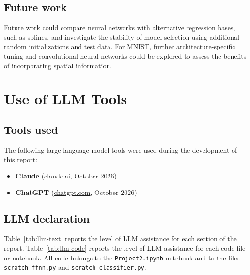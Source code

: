 \documentclass[amssymb,twocolumn,aps]{revtex4}
\begin{document}
\subsection*{Future work}
Future work could compare neural networks with alternative regression bases, such as splines, and investigate the stability of model selection using additional random initializations and test data. For MNIST, further architecture-specific tuning and convolutional neural networks could be explored to assess the benefits of incorporating spatial information.


\appendix
\section{Use of LLM Tools}
\subsection{Tools used}
The following large language model tools were used during the
development of this report:
\begin{itemize}
    \item \textbf{Claude} (\url{claude.ai}, October 2026)
    \item \textbf{ChatGPT} (\url{chatgpt.com}, October 2026)
\end{itemize}

\subsection{LLM declaration}
Table~\ref{tab:llm-text} reports the level of LLM assistance for each
section of the report.
Table~\ref{tab:llm-code} reports the level of LLM assistance for each
code file or notebook. All code belongs to the \texttt{Project2.ipynb} notebook and to the files \texttt{scratch\_ffnn.py} and \texttt{scratch\_classifier.py}.
\end{document}
